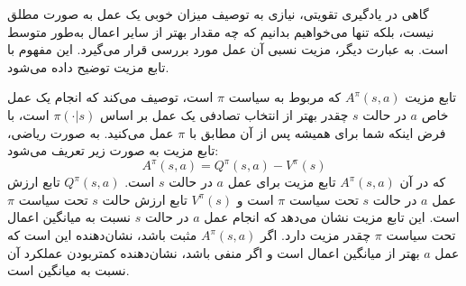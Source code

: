   گاهی در یادگیری تقویتی، نیازی به توصیف میزان خوبی یک عمل به صورت مطلق نیست، بلکه تنها می‌خواهیم بدانیم که چه مقدار بهتر از سایر اعمال به‌‌طور متوسط است. به عبارت دیگر، مزیت نسبی آن عمل مورد بررسی قرار می‌گیرد. این مفهوم با تابع مزیت توضیح داده می‌شود.
  
  تابع مزیت \( A^{\pi}(s,a) \) که مربوط به سیاست \( \pi \) است، توصیف می‌کند که انجام یک عمل خاص \( a \) در حالت \( s \) چقدر بهتر از انتخاب تصادفی یک عمل بر اساس \( \pi(\cdot|s) \) است، با فرض اینکه شما برای همیشه پس از آن مطابق با \( \pi \) عمل می‌کنید. به صورت ریاضی، تابع مزیت به صورت زیر تعریف می‌شود:
  \[
  A^{\pi}(s,a) = Q^{\pi}(s,a) - V^{\pi}(s)
  \]
که در آن \( A^{\pi}(s,a) \) تابع مزیت برای عمل \( a \) در حالت \( s \) است. \( Q^{\pi}(s,a) \) تابع ارزش عمل \( a \) در حالت \( s \) تحت سیاست \( \pi \) است و \( V^{\pi}(s) \) تابع ارزش حالت \( s \) تحت سیاست \( \pi \) است.
  این تابع مزیت نشان می‌دهد که انجام عمل \( a \) در حالت \( s \) نسبت به میانگین اعمال تحت سیاست \( \pi \) چقدر مزیت دارد. اگر \( A^{\pi}(s,a) \) مثبت باشد، نشان‌دهنده این است که عمل \( a \) بهتر از میانگین اعمال است و اگر منفی باشد، نشان‌دهنده کمتربودن عملکرد آن نسبت به میانگین است.
  
 
   
  
  
  
  
  
  
  
  